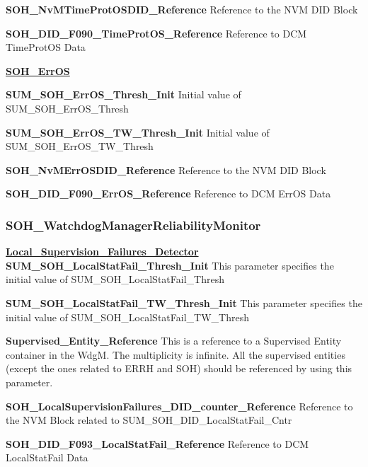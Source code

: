 \textbf{SOH\_NvMTimeProtOSDID\_Reference}\newline
Reference to the NVM DID Block

\textbf{SOH\_DID\_F090\_TimeProtOS\_Reference}\newline
Reference to DCM TimeProtOS Data

\textbf{\underline{SOH\_ErrOS}}\newline

\textbf{SUM\_SOH\_ErrOS\_Thresh\_Init}\newline
Initial value of SUM\_SOH\_ErrOS\_Thresh

\textbf{SUM\_SOH\_ErrOS\_TW\_Thresh\_Init}\newline
Initial value of SUM\_SOH\_ErrOS\_TW\_Thresh

\textbf{SOH\_NvMErrOSDID\_Reference}\newline
Reference to the NVM DID Block

\textbf{SOH\_DID\_F090\_ErrOS\_Reference}\newline
Reference to DCM ErrOS Data

\subsubsection{SOH\_WatchdogManagerReliabilityMonitor}

\textbf{\underline{Local\_Supervision\_Failures\_Detector}}\newline
\textbf{SUM\_SOH\_LocalStatFail\_Thresh\_Init}\newline
This parameter specifies the initial value of SUM\_SOH\_LocalStatFail\_Thresh

\textbf{SUM\_SOH\_LocalStatFail\_TW\_Thresh\_Init}\newline
This parameter specifies the initial value of SUM\_SOH\_LocalStatFail\_TW\_Thresh

\textbf{Supervised\_Entity\_Reference}\newline
This is a reference to a Supervised Entity container in the WdgM. The multiplicity is infinite. All the supervised entities (except the ones
related to ERRH and SOH) should be referenced by using this parameter.

\textbf{SOH\_LocalSupervisionFailures\_DID\_counter\_Reference }\newline
Reference to the NVM Block related to SUM\_SOH\_DID\_LocalStatFail\_Cntr

\textbf{SOH\_DID\_F093\_LocalStatFail\_Reference}\newline
Reference to DCM LocalStatFail Data

